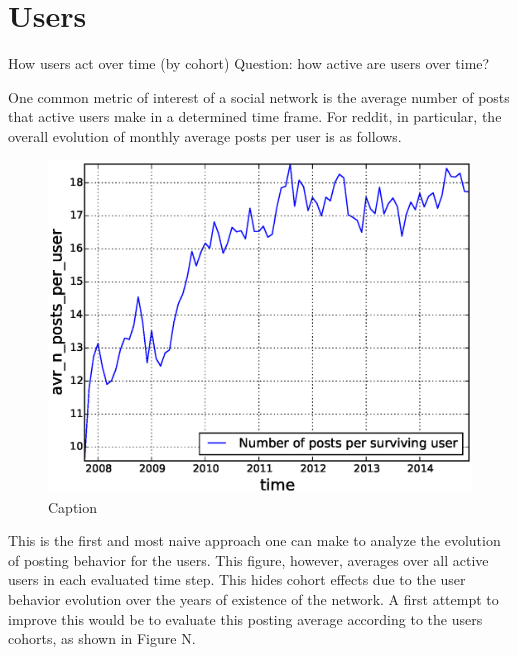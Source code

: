 \section{Users}

How users act over time (by cohort)
Question: how active are users over time?

One common metric of interest of a social network is the average number of posts that active users make in a determined time frame. For reddit, in particular, the overall evolution of monthly average posts per user is as follows.

\begin{figure}[!tb]
\centering
\includegraphics[scale=0.4]{./images/avr_posts_per_user_over_time_total.eps}
\caption{Caption}
\label{fig:avr_posts_per_user_over_time_total}
\end{figure}

This is the first and most naive approach one can make to analyze the evolution of posting behavior for the users. This figure, however, averages over all active users in each evaluated time step. This hides cohort effects due to the user behavior evolution over the years of existence of the network. A first attempt to improve this would be to evaluate this posting average according to the users cohorts, as shown in Figure N.

